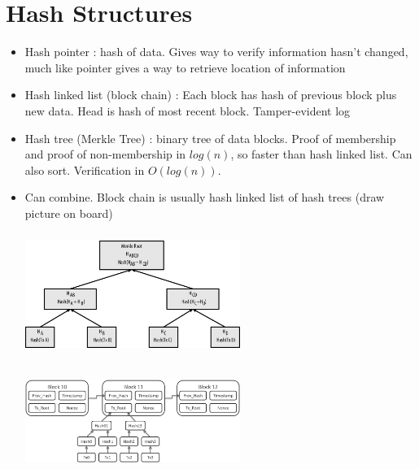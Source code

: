 \documentclass{article}
\begin{document}
\section*{Hash Structures}
\begin{itemize}
  \item Hash pointer : hash of data. Gives way to verify information hasn't changed, much like pointer gives a way to retrieve location of information
  \item Hash linked list (block chain) : Each block has hash of previous block plus new data. Head is hash of most recent block.
    \subitem Tamper-evident log
  \item Hash tree (Merkle Tree) : binary tree of data blocks. Proof of membership and proof of non-membership in $log(n)$, so faster than hash linked list. Can also sort.
    \subitem Verification in $O(log(n))$.
  \item Can combine. Block chain is usually hash linked list of hash trees  (draw picture on board)\\
    \begin{center}
      \includegraphics[width=7cm, height=4cm]{merkle.png}
      \includegraphics[width=7cm, height=4cm]{block_chain.png}
    \end{center}
\end{itemize}
\end{document}
